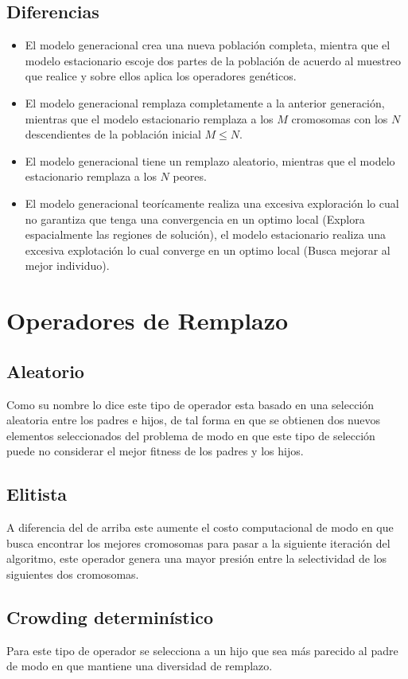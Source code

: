 \documentclass[10pt]{article}
\begin{document}
\subsection{Diferencias}
\begin{itemize}
  \item El modelo generacional crea una nueva población completa, mientra que el modelo estacionario escoje dos partes de la población de acuerdo al muestreo que realice y sobre ellos aplica los operadores genéticos.
  \item El modelo generacional remplaza completamente a la anterior generación, mientras que el modelo estacionario remplaza a los $M$ cromosomas con los $N$ descendientes de la población inicial $M\leq N$.
  \item El modelo generacional tiene un remplazo aleatorio, mientras que el modelo estacionario remplaza a los $N$ peores.
  \item El modelo generacional teorícamente realiza una excesiva exploración lo cual no garantiza que tenga una convergencia en un optimo local (Explora espacialmente las regiones de solución), el modelo estacionario realiza una excesiva explotación lo cual converge en un optimo local (Busca mejorar al mejor individuo).
\end{itemize}
\section{Operadores de Remplazo}
\subsection{Aleatorio}
Como su nombre lo dice este tipo de operador esta basado en una selección aleatoria entre los padres e hijos, de tal forma en que se obtienen dos nuevos elementos seleccionados del problema de modo en que este tipo de selección puede no considerar el mejor fitness de los padres y los hijos.
\subsection{Elitista}
A diferencia del de arriba este aumente el costo computacional de modo en que busca encontrar los mejores cromosomas para pasar a la siguiente iteración del algoritmo, este operador genera una mayor presión entre la selectividad de los siguientes dos cromosomas.
\subsection{Crowding determinístico}
Para este tipo de operador se selecciona a un hijo que sea más parecido al padre de modo en que mantiene una diversidad de remplazo.
\end{document}
